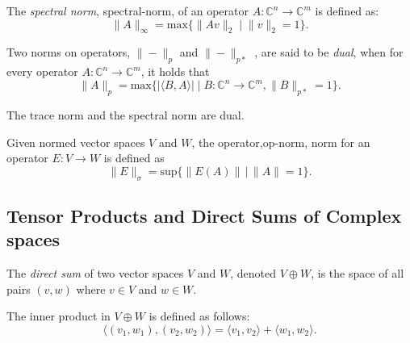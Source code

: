 \begin{definition} \label{def:spectral-norm}

  The \emph{spectral norm}, \gls{spectral-norm}, of an operator $A: \mathbb{C}^{n} \rightarrow \mathbb{C}^{m} $ is defined as:
  \begin{equation*}
    \lVert A \rVert_{\infty} = \text{max} \{ \lVert Av \rVert_{2} \mid \lVert v \rVert_{2} = 1 \}.
  \end{equation*}
\end{definition}

\begin{definition} \label{def:dual-norm}
  Two norms on operators, $\|-\|_p$ and $\|-\|_{p*}$ , are said to be \emph{dual}, when for every operator $A: \mathbb{C}^{n} \rightarrow \mathbb{C}^{m}$, it holds that
  \begin{equation*}
    \|A\|_{p} = \text{max} \{ |\langle B, A \rangle| \mid B:  \mathbb{C}^{n} \rightarrow \mathbb{C}^{m},\|B\|_{p*} = 1 \}.
  \end{equation*}
\end{definition}

The trace norm and the spectral norm are dual.


\begin{definition} \label{def:op_norm}
  Given  normed vector spaces $V$ and $W$, the operator,\gls{op-norm}, norm for an operator $E: V \rightarrow W$ is defined as
  \begin{equation*}
  \lVert E \rVert_{\sigma} = \text{sup} \{ \lVert E(A) \rVert \hspace{2pt} | \hspace{2pt} \lVert A \rVert = 1 \}.
\end{equation*}
\end{definition}




\subsection {Tensor Products and Direct Sums of Complex spaces}

\begin{definition}
  The \emph{direct sum} of two vector spaces $V$ and $W$, denoted $V \oplus W$, is the space of all pairs $(v, w)$ where $v \in V$ and $w \in W$.
\end{definition}

The inner product in $V \oplus W$ is defined as follows:
\begin{equation*}
  \langle (v_1, w_1), (v_2, w_2) \rangle = \langle v_1, v_2 \rangle + \langle w_1, w_2 \rangle.
\end{equation*}


